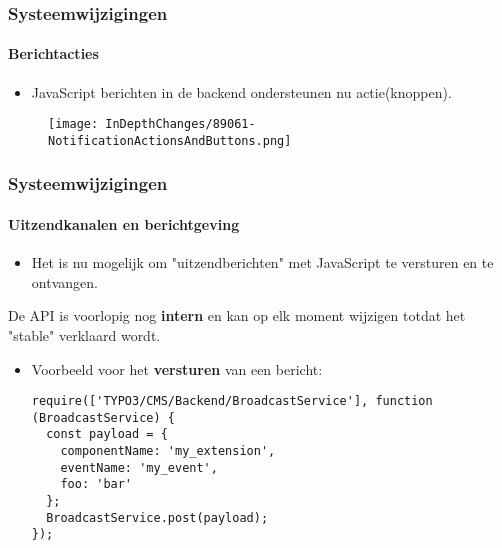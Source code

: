 
\begin{frame}[fragile]
	\frametitle{Systeemwijzigingen}
	\framesubtitle{Berichtacties}

	\begin{itemize}
		\item JavaScript berichten in de backend ondersteunen nu actie(knoppen).
	\end{itemize}

	\begin{figure}
		\texttt{[image: InDepthChanges/89061-NotificationActionsAndButtons.png]}
	\end{figure}

\end{frame}


\begin{frame}[fragile]
	\frametitle{Systeemwijzigingen}
	\framesubtitle{Uitzendkanalen en berichtgeving}

	\lstset{basicstyle=\tiny\ttfamily}

	\begin{itemize}
		\item Het is nu mogelijk om "uitzendberichten" met JavaScript te versturen en te ontvangen.
	\end{itemize}

	\vspace{-0.2cm}
	\begingroup
		\color{red}
			\begin{center}
				De API is voorlopig nog \textbf{intern}\newline
				en kan op elk moment wijzigen totdat het "stable" verklaard wordt.
			\end{center}
	\endgroup

	\begin{itemize}
		\item Voorbeeld voor het \textbf{versturen} van een bericht:
\begin{lstlisting}
require(['TYPO3/CMS/Backend/BroadcastService'], function (BroadcastService) {
  const payload = {
    componentName: 'my_extension',
    eventName: 'my_event',
    foo: 'bar'
  };
  BroadcastService.post(payload);
});
\end{lstlisting}

	\end{itemize}

\end{frame}

